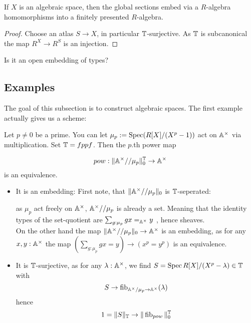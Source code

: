 \begin{lemma}
	If $X$ is an algebraic space, then the global sections embed via a $R$-algebra homomorphisms into a finitely presented $R$-algebra.
\end{lemma}
\begin{proof}
	Choose an atlas $S \to X$, in particular $\mathbb{T}$-surjective. As $\mathbb{T}$ is subcanonical the map $R^X \to R^S$ is an injection.
\end{proof}
\begin{question}
	Is it an open embedding of types?
\end{question}
\subsection{Examples}
The goal of this subsection is to construct algebraic spaces. The first example actually gives us a scheme:
\begin{example}
	Let $p \neq 0$ be a prime. You can let $\mu_p := \operatorname{Spec}(R[X] / (X^p - 1))$ act on $\mathbb{A}^\times$ via multiplication. Set $\mathbb{T}= fppf$. Then the $p$.th power map
	
	\[
	pow : \| \mathbb{A}^\times // \mu_p \|_0^{\mathbb{T}} \to \mathbb{A}^\times
	\]
	is an equivalence.
	\begin{itemize}
		\item 	 It is an embedding: 
		First note, that $\|\mathbb{A}^\times // \mu_p \|_0$ is $\mathbb{T}$-seperated:
		
		as $\mu_p$ act freely on $\mathbb{A}^\times$, $\mathbb{A}^\times // \mu_p$ is already a set. Meaning that the identity types of the set-quotient are $\sum_{g: \mu_p} g x =_{\mathbb{A}^\times} y$ , hence sheaves. \\
		On the other hand the map $\|\mathbb{A}^\times // \mu_p \|_0 \to \mathbb{A}^\times$ is an embedding, as for any $x , y : \mathbb{A}^\times$ the map $(\sum_{g : \mu_p} g x = y) \to (x^p = y^p)$ is an equivalence. 
		\item 	It is $\mathbb{T}$-surjective, as for any $\lambda : \mathbb{A}^\times$, we find $S = \operatorname{Spec} R [X] / (X^p - \lambda) \in \mathbb{T}$ with 
		\[
		S \to \operatorname{fib}_{\mathbb{A}^\times / \mu_p \to \mathbb{A}^\times}(\lambda)
		\]
		hence 
		\[
		1 = \|S\|_{\mathbb{T}} \to \|\operatorname{fib}_{pow}\|_0^{\mathbb{T}}
		\]
	\end{itemize}
	
	
\end{example}


